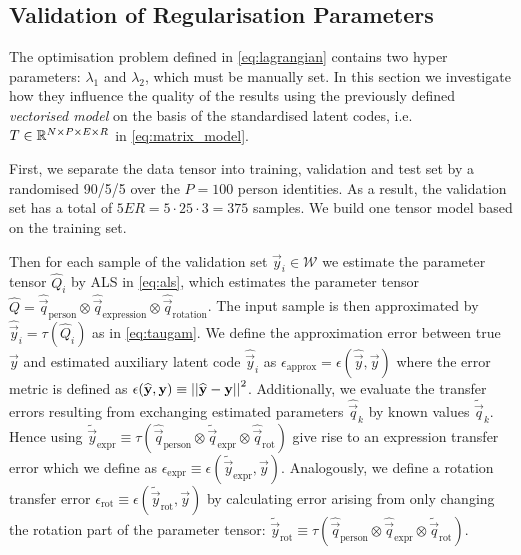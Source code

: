 

\subsection{Validation of Regularisation Parameters}
\label{sec:validation}

The optimisation problem defined in \eqref{eq:lagrangian} contains two hyper parameters: $\lambda_1$ and  $\lambda_2$, which must be manually set.
In this section we investigate how they influence the quality of the results using the previously defined \emph{vectorised model} on the basis of the standardised latent codes, i.e. $T\in\mathbb{R}^{N\times P\times E\times R}$ in \eqref{eq:matrix_model}. 

First, we separate the data tensor into  training, validation and test set by a randomised 90/5/5 over the $P=100$ person identities. As a result, the validation set has a total of $5E R=5\cdot25\cdot3=375$ samples. 
We build one tensor model based on the training set. 

Then for each sample of the validation set $\vec{y}_i\in\mathcal{W}$ we estimate the parameter tensor $\widehat{Q}_i$ by ALS in \eqref{eq:als}, which estimates the  parameter tensor  $\widehat{Q} = \widehat{\vec{q}}_\text{person} \otimes \widehat{\vec{q}}_\text{expression} \otimes \widehat{\vec{q}}_\text{rotation}$. The input sample is then approximated by $\widehat{\vec{y}}_i = \tau(\widehat{Q}_i)$ as in \eqref{eq:taugam}. 
We define the approximation error between true $\vec{y}$ and estimated auxiliary latent code $\widehat{\vec{y}}_i$ as $\epsilon_\text{approx} =\epsilon(\widehat{\vec{y}},\vec{y})$ where the error metric is defined as
$\epsilon(\widehat{\mathbf{y}},\mathbf{y}) \equiv  \left|\left|\widehat{\mathbf{y}}-\mathbf{y}\right|\right|^2$. 
Additionally, we evaluate the transfer errors resulting from exchanging estimated parameters $\hat{\vec{q}}_k$ by known values $\tilde{\vec{q}}_k$. Hence using $\widetilde{\vec{y}}_\text{expr} \equiv \tau(\widehat{\vec{q}}_{\text{person}} \otimes \widetilde{\vec{q}}_{\text{expr}}\otimes \widehat{\vec{q}}_{\text{rot}})$ give rise to an expression transfer error which we define as $\epsilon_\text{expr}\equiv\epsilon(\widetilde{\vec{y}}_\text{expr},\vec{y})$. 
Analogously, we define a rotation transfer error $\epsilon_\text{rot} \equiv \epsilon(\widetilde{\vec{y}}_\text{rot},\vec{y})$ by calculating error arising from only changing the rotation part of the parameter tensor: $\widetilde{\vec{y}}_\text{rot} \equiv \tau(\widehat{\vec{q}}_{\text{person}}\otimes\widehat{\vec{q}}_{\text{expr}}\otimes\widetilde{\vec{q}}_{\text{rot}})$.

